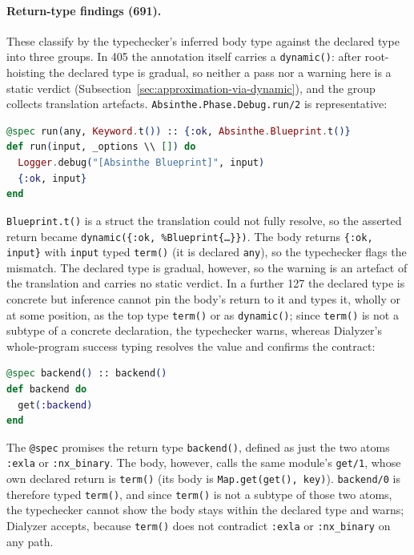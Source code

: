 \paragraph{Return-type findings (691).}
These classify by the typechecker's inferred body type against the declared type into three groups.
In \num{405} the annotation itself carries a \texttt{dynamic()}: after root-hoisting the declared type is gradual, so neither a pass nor a warning here is a static verdict (Subsection~\ref{sec:approximation-via-dynamic}), and the group collects translation artefacts. \texttt{Absinthe.Phase.Debug.run/2} is representative:
\begin{lstlisting}[language=Elixir, firstnumber=last]
@spec run(any, Keyword.t()) :: {:ok, Absinthe.Blueprint.t()}
def run(input, _options \\ []) do
  Logger.debug("[Absinthe Blueprint]", input)
  {:ok, input}
end
\end{lstlisting}
\texttt{Blueprint.t()} is a struct the translation could not fully resolve, so the asserted return became \texttt{dynamic(\{:ok, \%Blueprint\{\dots\}\})}. The body returns \texttt{\{:ok, input\}} with \texttt{input} typed \texttt{term()} (it is declared \texttt{any}), so the typechecker flags the mismatch. The declared type is gradual, however, so the warning is an artefact of the translation and carries no static verdict.
In a further 127 the declared type is concrete but inference cannot pin the body's return to it and types it, wholly or at some position, as the top type \texttt{term()} or as \texttt{dynamic()}; since \texttt{term()} is not a subtype of a concrete declaration, the typechecker warns, whereas Dialyzer's whole-program success typing resolves the value and confirms the contract:
\begin{lstlisting}[language=Elixir, firstnumber=last]
@spec backend() :: backend()
def backend do
  get(:backend)
end
\end{lstlisting}
The \texttt{@spec} promises the return type \texttt{backend()}, defined as just the two atoms \texttt{:exla} or \texttt{:nx\_binary}. The body, however, calls the same module's \texttt{get/1}, whose own declared return is \texttt{term()} (its body is \texttt{Map.get(get(), key)}). \texttt{backend/0} is therefore typed \texttt{term()}, and since \texttt{term()} is not a subtype of those two atoms, the typechecker cannot show the body stays within the declared type and warns; Dialyzer accepts, because \texttt{term()} does not contradict \texttt{:exla} or \texttt{:nx\_binary} on any path.

